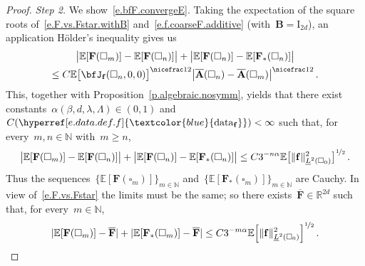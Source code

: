 \documentclass[11pt,twoside]{article} %
\let\oldsquare\square %
\renewcommand{\square}{\oldsquare}
\numberwithin{equation}{section}
\theoremstyle{definition}
\newcommand{\datareff}{\hyperref[e.data.def.f]{\textcolor{blue}{\ensuremath{\mathrm{data}_{\mathbf{f}}}}}}
\newcommand*{\Itwod}{\ensuremath{\mathrm{I}_{2d}}}
\newcommand*{\N}{\ensuremath{\mathbb{N}}}
\newcommand*{\R}{\ensuremath{\mathbb{R}}}
\newcommand{\f}{\mathbf{f}}
\newcommand{\cu}{\square}
\newcommand{\E}{\mathbb{E}}
\newcommand{\bfAhom}{\overline{\mathbf{A}}}
\newcommand{\bfF}{\mathbf{F}}
\begin{document}
\begin{proof}
\emph{Step 2.} We show~\eqref{e.bfF.convergeE}. Taking the expectation of the square roots of~\eqref{e.F.vs.Fstar.withB} and~\eqref{e.f.coarseF.additive} (with~$\mathbf{B} = \Itwod$), an application H\"older's inequality gives us
\begin{multline*} 
\bigl| \E[\bfF(\cu_m)] -   \E[\bfF(\cu_n)] \bigr|  
+ 
\bigl| \E[\bfF(\cu_n)] -   \E[\bfF_*(\cu_n)] \bigr|  
\\ 
\leq 
C \E\bigl[ \bfJ_{\f}(\cu_n,0,0) \bigr]^{\nicefrac12} \bigl| \bfAhom(\cu_n) -   \bfAhom(\cu_m)\bigr|^{\nicefrac12}
 \,.
\end{multline*}
This, together with Proposition~\ref{p.algebraic.nosymm}, 
yields that there exist constants~$\alpha(\beta,d,\lambda,\Lambda) \in (0,1)$ and~$C(\datareff) < \infty$ such that, for every~$m,n \in \N$ with~$m \geq n$, 
\begin{align}  \label{e.bF.diffexp}
\bigl| \E[\bfF(\cu_m)] -   \E[\bfF(\cu_n)] \bigr|  
+ 
\bigl| \E[\bfF(\cu_n)] -   \E[\bfF_*(\cu_n)] \bigr|  
\leq 
C 3^{-n \alpha}  \E\bigl[ \| \f \|_{\underline{L}^2(\cu_0)}^2 \bigr]^{\nicefrac12} 
\,.
\end{align}
Thus the sequences~$\{ \E [ \bfF(\cu_m)]\}_{m\in\N}$ and~$\{ \E [ \bfF_*(\cu_m)]\}_{m\in\N}$ are Cauchy. In view of~\eqref{e.F.vs.Fstar} the limits must be the same; so there exists~$\overline{\bfF} \in \R^{2d}$ such that, for every~$m\in\N$,
\begin{equation} \label{e.f.coarseF.expectation}
| \E[\bfF(\cu_m)] -  \overline{\bfF}|
+
|  \E[ \bfF_*(\cu_m)] - \overline{\bfF} |   
\leq 
C 3^{-m \alpha}  \E\Bigl[ \| \f \|_{\underline{L}^2(\cu_0)}^2 \Bigr]^{\nicefrac12} 
\,.
\end{equation}

\smallskip


\end{proof}
\end{document}
